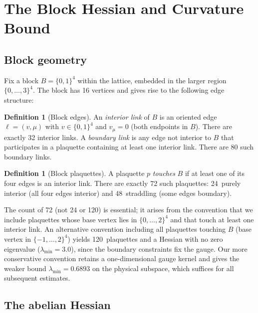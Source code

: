 \documentclass[11pt]{article}
\theoremstyle{definition}
\newtheorem{definition}[theorem]{Definition}
\begin{document}
\section{The Block Hessian and Curvature Bound}\label{sec:block}

\subsection{Block geometry}\label{subsec:blockgeom}

Fix a block $B=\{0,1\}^4$ within the lattice, embedded in the larger
region $\{0,\ldots,3\}^4$.  The block has 16 vertices and gives rise
to the following edge structure:

\begin{definition}[Block edges]\label{def:edges}
An \emph{interior link} of $B$ is an oriented edge
$\ell=(v,\mu)$ with $v\in\{0,1\}^4$ and $v_\mu=0$ (both endpoints
in $B$).  There are exactly 32 interior links.  A \emph{boundary link}
is any edge not interior to $B$ that participates in a plaquette
containing at least one interior link.  There are 80 such boundary
links.
\end{definition}

\begin{definition}[Block plaquettes]\label{def:plaq}
A plaquette $p$ \emph{touches} $B$ if at least one of its four edges
is an interior link.  There are exactly 72 such plaquettes:
24~purely interior (all four edges interior) and 48~straddling (some
edges boundary).
\end{definition}

The count of 72 (not 24 or 120) is essential; it arises from the
convention that we include plaquettes whose base vertex lies in
$\{0,\ldots,2\}^4$ and that touch at least one interior link.  An
alternative convention including all plaquettes touching $B$
(base vertex in $\{-1,\ldots,2\}^4$) yields 120~plaquettes and a
Hessian with no zero eigenvalue ($\lambda_{\min}=3.0$), since the
boundary constraints fix the gauge.  Our more conservative convention
retains a one-dimensional gauge kernel and gives the weaker bound
$\lambda_{\min}=0.6893$ on the physical subspace, which suffices for
all subsequent estimates.

\subsection{The abelian Hessian}\label{subsec:hessian}
\end{document}
